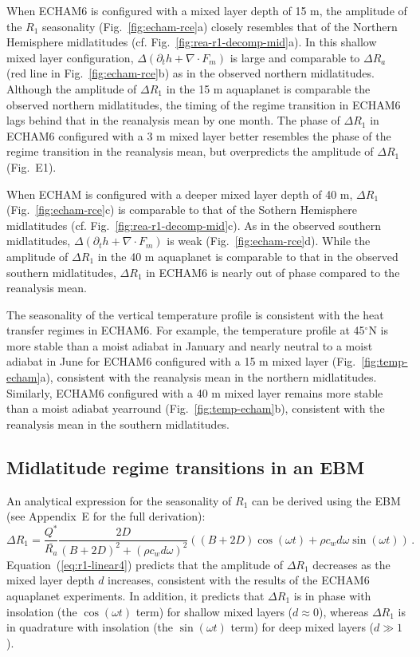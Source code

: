 \documentclass{ametsocV5}
\begin{document}
  When ECHAM6 is configured with a mixed layer depth of 15 m, the amplitude of the \(R_{1}\) seasonality (Fig.~\ref{fig:echam-rce}a) closely resembles that of the Northern Hemisphere midlatitudes (cf. Fig.~\ref{fig:rea-r1-decomp-mid}a). In this shallow mixed layer configuration, $\Delta (\partial_t h+\nabla\cdot F_m)$ is large and comparable to $\Delta R_a$ (red line in Fig.~\ref{fig:echam-rce}b) as in the observed northern midlatitudes. Although the amplitude of $\Delta R_1$ in the 15 m aquaplanet is comparable the observed northern midlatitudes, the timing of the regime transition in ECHAM6 lags behind that in the reanalysis mean by one month. The phase of $\Delta R_1$ in ECHAM6 configured with a 3 m mixed layer better resembles the phase of the regime transition in the reanalysis mean, but overpredicts the amplitude of $\Delta R_1$ (Fig.~E1).

  When ECHAM is configured with a deeper mixed layer depth of 40 m, \(\Delta R_{1}\) (Fig.~\ref{fig:echam-rce}c) is comparable to that of the Sothern Hemisphere midlatitudes (cf. Fig.~\ref{fig:rea-r1-decomp-mid}c). As in the observed southern midlatitudes, $\Delta(\partial_t h + \nabla\cdot F_m)$ is weak (Fig.~\ref{fig:echam-rce}d). While the amplitude of $\Delta R_1$ in the 40 m aquaplanet is comparable to that in the observed southern midlatitudes, \(\Delta R_{1}\) in ECHAM6 is nearly out of phase compared to the reanalysis mean.

  The seasonality of the vertical temperature profile is consistent with the heat transfer regimes in ECHAM6. For example, the temperature profile at 45$^\circ$N is more stable than a moist adiabat in January and nearly neutral to a moist adiabat in June for ECHAM6 configured with a 15 m mixed layer (Fig.~\ref{fig:temp-echam}a), consistent with the reanalysis mean in the northern midlatitudes. Similarly, ECHAM6 configured with a 40 m mixed layer remains more stable than a moist adiabat yearround (Fig.~\ref{fig:temp-echam}b), consistent with the reanalysis mean in the southern midlatitudes.

  \subsection{Midlatitude regime transitions in an EBM}

    An analytical expression for the seasonality of $R_1$ can be derived using the \cite{rose2017} EBM (see Appendix~E for the full derivation):
    \begin{equation} \label{eq:r1-linear4}
      \Delta R_{1} = \frac{Q^{*}}{\overline{R_{a}}}\frac{2D}{(B+2D)^{2}+(\rho c_w d \omega)^{2}}\left((B+2D)\cos(\omega t)+\rho c_w d \omega \sin(\omega t)\right) \, .
    \end{equation}
    Equation~(\ref{eq:r1-linear4}) predicts that the amplitude of $\Delta R_1$ decreases as the mixed layer depth $d$ increases, consistent with the results of the ECHAM6 aquaplanet experiments. In addition, it predicts that $\Delta R_1$ is in phase with insolation (the $\cos(\omega t)$ term) for shallow mixed layers ($d \approx 0$), whereas $\Delta R_1$ is in quadrature with insolation (the $\sin(\omega t)$ term) for deep mixed layers ($d \gg 1 $).
    
\end{document}

